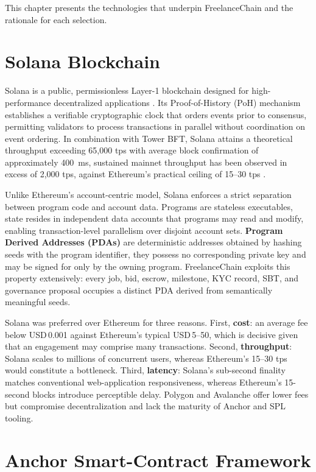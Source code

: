 This chapter presents the technologies that underpin FreelanceChain and the rationale for each selection.

\section{Solana Blockchain}
\label{section:3.1}

Solana is a public, permissionless Layer-1 blockchain designed for high-performance decentralized applications \cite{yakovenko2018solana}. Its Proof-of-History (PoH) mechanism establishes a verifiable cryptographic clock that orders events prior to consensus, permitting validators to process transactions in parallel without coordination on event ordering. In combination with Tower BFT, Solana attains a theoretical throughput exceeding 65{,}000 \gls{tps} with average block confirmation of approximately 400~ms, sustained mainnet throughput has been observed in excess of 2{,}000 \gls{tps}, against Ethereum's practical ceiling of 15--30 \gls{tps} \cite{solana2021performance}.

Unlike Ethereum's account-centric model, Solana enforces a strict separation between program code and account data. Programs are stateless executables, state resides in independent data accounts that programs may read and modify, enabling transaction-level parallelism over disjoint account sets. \textbf{Program Derived Addresses (PDAs)} are deterministic addresses obtained by hashing seeds with the program identifier, they possess no corresponding private key and may be signed for only by the owning program. FreelanceChain exploits this property extensively: every job, bid, escrow, milestone, KYC record, SBT, and governance proposal occupies a distinct PDA derived from semantically meaningful seeds.

Solana was preferred over Ethereum for three reasons. First, \textbf{cost}: an average fee below USD\,0.001 against Ethereum's typical USD\,5--50, which is decisive given that an engagement may comprise many transactions. Second, \textbf{throughput}: Solana scales to millions of concurrent users, whereas Ethereum's 15--30 \gls{tps} would constitute a bottleneck. Third, \textbf{latency}: Solana's sub-second finality matches conventional web-application responsiveness, whereas Ethereum's 15-second blocks introduce perceptible delay. Polygon and Avalanche offer lower fees but compromise decentralization and lack the maturity of Anchor and SPL tooling.

\section{Anchor Smart-Contract Framework}
\label{section:3.2}

